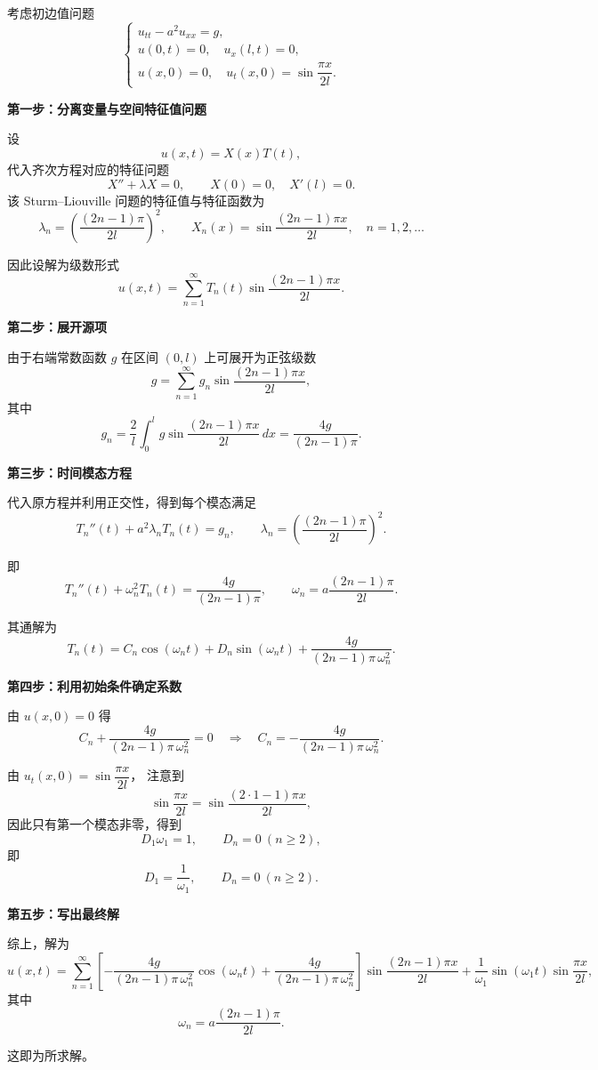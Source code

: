 \begin{solution}
考虑初边值问题
\[
\begin{cases}
u_{tt}-a^{2}u_{xx}=g,\\
u(0,t)=0,\quad u_x(l,t)=0,\\
u(x,0)=0,\quad u_t(x,0)=\sin\dfrac{\pi x}{2l}.
\end{cases}
\]

\medskip
\noindent\textbf{第一步：分离变量与空间特征值问题}

设
\[
u(x,t)=X(x)T(t),
\]
代入齐次方程对应的特征问题
\[
X''+\lambda X=0,
\qquad
X(0)=0,\quad X'(l)=0.
\]
该 Sturm--Liouville 问题的特征值与特征函数为
\[
\lambda_n=\left(\frac{(2n-1)\pi}{2l}\right)^2,
\qquad
X_n(x)=\sin\frac{(2n-1)\pi x}{2l},
\quad n=1,2,\dots
\]

因此设解为级数形式
\[
u(x,t)=\sum_{n=1}^{\infty} T_n(t)\sin\frac{(2n-1)\pi x}{2l}.
\]

\medskip
\noindent\textbf{第二步：展开源项}

由于右端常数函数 $g$ 在区间 $(0,l)$ 上可展开为正弦级数
\[
g=\sum_{n=1}^{\infty} g_n \sin\frac{(2n-1)\pi x}{2l},
\]
其中
\[
g_n=\frac{2}{l}\int_0^l g\sin\frac{(2n-1)\pi x}{2l}\,dx
=\frac{4g}{(2n-1)\pi}.
\]

\medskip
\noindent\textbf{第三步：时间模态方程}

代入原方程并利用正交性，得到每个模态满足
\[
T_n''(t)+a^{2}\lambda_n T_n(t)=g_n,
\qquad
\lambda_n=\left(\frac{(2n-1)\pi}{2l}\right)^2.
\]

即
\[
T_n''(t)+\omega_n^2 T_n(t)=\frac{4g}{(2n-1)\pi},
\qquad
\omega_n=a\frac{(2n-1)\pi}{2l}.
\]

其通解为
\[
T_n(t)
=C_n\cos(\omega_n t)+D_n\sin(\omega_n t)
+\frac{4g}{(2n-1)\pi\,\omega_n^2}.
\]

\medskip
\noindent\textbf{第四步：利用初始条件确定系数}

由 $u(x,0)=0$ 得
\[
C_n+\frac{4g}{(2n-1)\pi\,\omega_n^2}=0
\quad\Rightarrow\quad
C_n=-\frac{4g}{(2n-1)\pi\,\omega_n^2}.
\]

由 $u_t(x,0)=\sin\dfrac{\pi x}{2l}$，
注意到
\[
\sin\frac{\pi x}{2l}
=
\sin\frac{(2\cdot1-1)\pi x}{2l},
\]
因此只有第一个模态非零，得到
\[
D_1\omega_1=1,\qquad D_n=0\ (n\ge2),
\]
即
\[
D_1=\frac{1}{\omega_1},\qquad D_n=0\ (n\ge2).
\]

\medskip
\noindent\textbf{第五步：写出最终解}

综上，解为
\[
u(x,t)
=
\sum_{n=1}^{\infty}
\left[
-\frac{4g}{(2n-1)\pi\,\omega_n^2}\cos(\omega_n t)
+\frac{4g}{(2n-1)\pi\,\omega_n^2}
\right]
\sin\frac{(2n-1)\pi x}{2l}
+\frac{1}{\omega_1}\sin(\omega_1 t)\sin\frac{\pi x}{2l},
\]
其中
\[
\omega_n=a\frac{(2n-1)\pi}{2l}.
\]

这即为所求解。
\end{solution}
